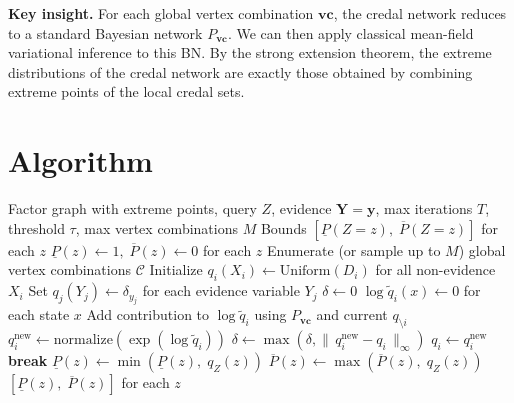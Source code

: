 \documentclass[11pt]{article}
\begin{document}
\textbf{Key insight.} For each global vertex combination $\mathbf{vc}$, the credal network
reduces to a standard Bayesian network $P_{\mathbf{vc}}$. We can then apply classical
mean-field variational inference to this BN. By the strong extension theorem, the
extreme distributions of the credal network are exactly those obtained by combining
extreme points of the local credal sets.

\section{Algorithm}

\begin{algorithm}[H]
\caption{Mean-Field Variational Inference for Credal Networks}
\label{alg:vi}
\begin{algorithmic}[1]
\Require Factor graph with extreme points, query $Z$, evidence $\mathbf{Y} = \mathbf{y}$,
         max iterations $T$, threshold $\tau$, max vertex combinations $M$
\Ensure Bounds $[\underline{P}(Z{=}z),\; \overline{P}(Z{=}z)]$ for each $z$
\Statex
\State $\underline{P}(z) \gets 1,\; \overline{P}(z) \gets 0$ for each $z$
\State Enumerate (or sample up to $M$) global vertex combinations $\mathcal{C}$
\Statex
{}
  \State Initialize $q_i(X_i) \gets \mathrm{Uniform}(D_i)$ for all non-evidence $X_i$
  \State Set $q_j(Y_j) \gets \delta_{y_j}$ for each evidence variable $Y_j$
  \Statex
    \State $\delta \gets 0$
      \State $\log \tilde{q}_i(x) \gets 0$ for each state $x$
        \State Add contribution to $\log \tilde{q}_i$ using $P_{\mathbf{vc}}$
               and current $q_{\setminus i}$
      \EndFor
      \State $q_i^{\mathrm{new}} \gets \mathrm{normalize}(\exp(\log \tilde{q}_i))$
      \State $\delta \gets \max(\delta, \|\,q_i^{\mathrm{new}} - q_i\,\|_\infty)$
      \State $q_i \gets q_i^{\mathrm{new}}$
    \EndFor
    \If{$\delta < \tau$} \textbf{break} \EndIf
  \EndFor
  \Statex
    \State $\underline{P}(z) \gets \min(\underline{P}(z),\; q_Z(z))$
    \State $\overline{P}(z) \gets \max(\overline{P}(z),\; q_Z(z))$
  \EndFor
\EndFor
\State \Return $[\underline{P}(z),\; \overline{P}(z)]$ for each $z$
\end{algorithmic}
\end{algorithm}
\end{document}
